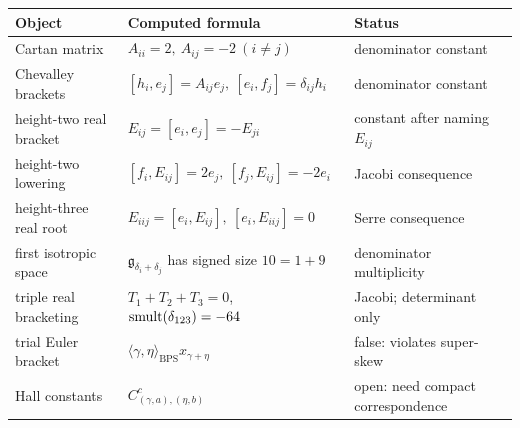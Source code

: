 \begin{center}
\begingroup
\small
\begin{tabular}{p{}|p{}|p{}}
\textbf{Object} & \textbf{Computed formula} & \textbf{Status}\\
\hline
Cartan matrix &
\(A_{ii}=2,\ A_{ij}=-2\ (i\neq j)\) &
denominator constant\\
Chevalley brackets &
\([h_i,e_j]=A_{ij}e_j,\ [e_i,f_j]=\delta_{ij}h_i\) &
denominator constant\\
height-two real bracket &
\(E_{ij}=[e_i,e_j]=-E_{ji}\) &
constant after naming \(E_{ij}\)\\
height-two lowering &
\([f_i,E_{ij}]=2e_j,\ [f_j,E_{ij}]=-2e_i\) &
Jacobi consequence\\
height-three real root &
\(E_{iij}=[e_i,E_{ij}],\ [e_i,E_{iij}]=0\) &
Serre consequence\\
first isotropic space &
\(\mathfrak g_{\delta_i+\delta_j}\) has signed size \(10=1+9\) &
denominator multiplicity\\
triple real bracketing &
\(T_1+T_2+T_3=0\), \(\operatorname{smult}(\delta_{123})=-64\) &
Jacobi; determinant only\\
trial Euler bracket &
\(\langle\gamma,\eta\rangle_{\mathrm{BPS}}x_{\gamma+\eta}\) &
false: violates super-skew\\
Hall constants &
\(C^c_{(\gamma,a),(\eta,b)}\) &
open: need compact correspondence
\end{tabular}
\endgroup
\end{center}
